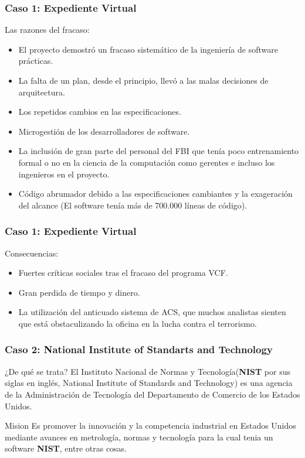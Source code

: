\documentclass[11pt]{beamer}
\begin{document}
	\begin{frame}
		\frametitle{Caso 1: Expediente Virtual}
		\begin{block}{Las razones del fracaso:}
			\begin{itemize}
				\item El proyecto demostró un fracaso sistemático de la ingeniería de software prácticas.
				\pause
				\item La falta de un plan, desde el principio, llevó a las malas decisiones de arquitectura.
				\pause
				\item Los repetidos cambios en las especificaciones.
				\pause
				\item Microgestión de los desarrolladores de software.
				\pause
				\item La inclusión de gran parte del personal del FBI que tenía poco entrenamiento formal o no en la ciencia de la computación como gerentes e incluso los ingenieros en el proyecto.
				\pause
				\item Código abrumador debido a las especificaciones cambiantes y la exageración del alcance (El software tenía más de 700.000 líneas de código).
			\end{itemize}
		\end{block}
	\end{frame}

	\begin{frame}
		\frametitle{Caso 1: Expediente Virtual}
		\begin{block}{Consecuencias:}
			\begin{itemize}
				\item Fuertes críticas sociales tras el fracaso del programa VCF.
				\item Gran perdida de tiempo y dinero.
				\item La utilización del anticuado sistema de ACS, que muchos analistas sienten que está obstaculizando la oficina en la lucha contra el terrorismo.
			\end{itemize}
		\end{block}
	\end{frame}

	\begin{frame}
		\frametitle{Caso 2: National Institute of Standarts and Technology}
		\begin{block}{¿De qué se trata?}
			El Instituto Nacional de Normas y Tecnología(\textbf{NIST} por sus siglas en inglés, National Institute of Standards and Technology) es una agencia de la Administración de Tecnología del Departamento de Comercio de los Estados Unidos.
		\end{block}
	    \pause
	    \begin{block}{Mision}
	    	Es promover la innovación y la competencia industrial en Estados Unidos mediante avances en metrología, normas y tecnología para la cual tenia un software \textbf{NIST}, entre otras cosas.
	    \end{block}
	\end{frame}
\end{document}
